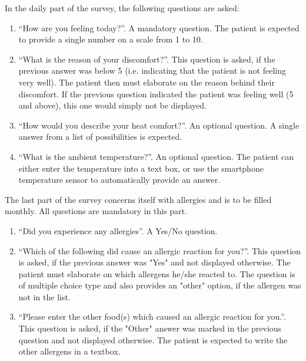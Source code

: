 In the daily part of the survey, the following questions are asked: 

\begin{enumerate}
\item ``How are you feeling today?''. A mandatory question. The patient is expected to provide a single number on a scale from 1 to 10.
\item ``What is the reason of your discomfort?''. This question is asked, if the previous answer was below 5 (i.e. indicating that the patient is not feeling very well). The patient then must elaborate on the reason behind their discomfort. If the previous question indicated the patient was feeling well (5 and above), this one would simply not be displayed.
\item ``How would you describe your heat comfort?''. An optional question. A single answer from a list of possibilities is expected.
\item ``What is the ambient temperature?''. An optional question. The patient can either enter the temperature into a text box, or use the smartphone temperature sensor to automatically provide an answer.
\end{enumerate}

The last part of the survey concerns itself with allergies and is to be filled monthly. All questions are mandatory in this part.

\begin{enumerate}
\item ``Did you experience any allergies''. A Yes/No question.
\item ``Which of the following did cause an allergic reaction for you?''. This question is asked, if the previous answer was "Yes" and not displayed otherwise. The patient must elaborate on which allergens he/she reacted to. The question is of multiple choice type and also provides an "other" option, if the allergen was not in the list.
\item ``Please enter the other food(s) which caused an allergic reaction for you.''. This question is asked, if the "Other" answer was marked in the previous question and not displayed otherwise. The patient is expected to write the other allergens in a textbox.
\end{enumerate}

